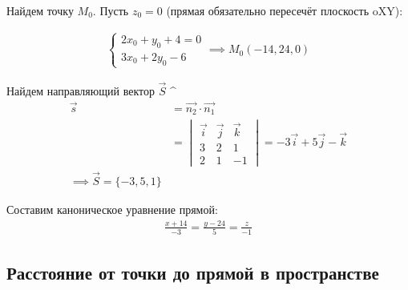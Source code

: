 Найдем точку $M_0$.
Пусть $z_0 = 0$ (прямая обязательно пересечёт плоскость oXY):

\begin{gather*}
  \begin{cases}
    2x_0 + y_0 + 4 = 0 \\
    3x_0 + 2y_0 - 6
  \end{cases} \implies 
  M_0(-14, 24, 0)
\end{gather*}

Найдем направляющий вектор $\vec{S}$ ^
\begin{gather*}
  \vec{s} &= \vec{n_2} \cdot \vec{n_1} \\
          &= 
  \begin{vmatrix}
    \vec{i} & \vec{j} & \vec{k} \\
    3 & 2 & 1 \\
    2 & 1 & -1
  \end{vmatrix} = -3 \vec{i} + 5 \vec{j} - \vec{k} \\
  \implies \vec{S} = \{-3, 5, 1\} 
\end{gather*}

Составим каноническое уравнение прямой:
\begin{gather*}
  \frac{x + 14}{-3} = \frac{y - 24}{5} = \frac{z}{-1}
\end{gather*}

\subsection{Расстояние от точки до прямой в пространстве}

